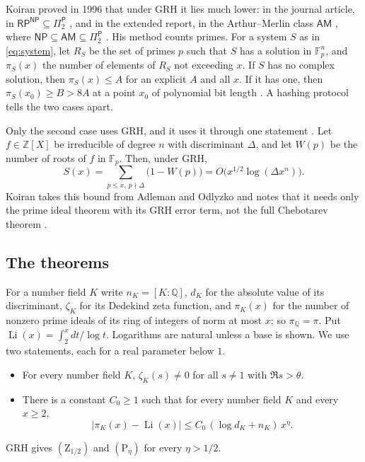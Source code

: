 \documentclass[11pt]{amsart}
\theoremstyle{definition}
\theoremstyle{remark}
\newcommand{\Z}{\mathbb Z}
\newcommand{\Q}{\mathbb Q}
\newcommand{\F}{\mathbb F}
\newcommand{\cl}[1]{\mathsf{#1}}
\newcommand{\AM}{\cl{AM}}
\newcommand{\Pitwo}{\Pi_2^{\cl P}}
\newcommand{\Zh}[1]{(\mathrm Z_{#1})}
\newcommand{\Ph}[1]{(\mathrm P_{#1})}
\newcommand{\Li}{\operatorname{Li}}
\begin{document}
Koiran proved in 1996 that under GRH it lies much lower: in the journal article, in $\cl{RP}^{\cl{NP}}\subseteq\Pitwo$ \cite[Theorem~2, p.~276]{K96}, and in the extended report, in the Arthur--Merlin class $\AM$ \cite[Theorem~2, p.~5]{K96b}, where $\cl{NP}\subseteq\AM\subseteq\Pitwo$ \cite[abstract]{K96b}. His method counts primes. For a system $S$ as in \eqref{eq:system}, let $R_S$ be the set of primes $p$ such that $S$ has a solution in $\F_p^n$, and $\pi_S(x)$ the number of elements of $R_S$ not exceeding $x$. If $S$ has no complex solution, then $\pi_S(x)\le A$ for an explicit $A$ and all $x$. If it has one, then $\pi_S(x_0)\ge B>8A$ at a point $x_0$ of polynomial bit length \cite[Theorem~1, p.~275]{K96}. A hashing protocol tells the two cases apart.

Only the second case uses GRH, and it uses it through one statement \cite[Theorem~9, p.~282]{K96}. Let $f\in\Z[X]$ be irreducible of degree $n$ with discriminant $\Delta$, and let $W(p)$ be the number of roots of $f$ in $\F_p$. Then, under GRH,
\begin{equation}\label{eq:K9}
 S(x)=\sum_{p\le x,\ p\nmid\Delta}\bigl(1-W(p)\bigr)=O\bigl(x^{1/2}\log(\Delta x^n)\bigr).
\end{equation}
Koiran takes this bound from Adleman and Odlyzko and notes that it needs only the prime ideal theorem with its GRH error term, not the full Chebotarev theorem \cite[p.~282]{K96}.

\subsection{The theorems}
For a number field $K$ write $n_K=[K:\Q]$, $d_K$ for the absolute value of its discriminant, $\zeta_K$ for its Dedekind zeta function, and $\pi_K(x)$ for the number of nonzero prime ideals of its ring of integers of norm at most $x$; so $\pi_\Q=\pi$. Put $\Li(x)=\int_2^x dt/\log t$. Logarithms are natural unless a base is shown. We use two statements, each for a real parameter below $1$.
\begin{itemize}
\item[$\Zh\theta$] For every number field $K$, $\zeta_K(s)\ne0$ for all $s\ne1$ with $\Re s>\theta$.
\item[$\Ph\eta$] There is a constant $C_0\ge1$ such that for every number field $K$ and every $x\ge2$,
\[
 \bigl|\pi_K(x)-\Li(x)\bigr|\le C_0\,(\log d_K+n_K)\,x^{\eta}.
\]
\end{itemize}
GRH gives $\Zh{1/2}$ and $\Ph\eta$ for every $\eta>1/2$.
\end{document}
